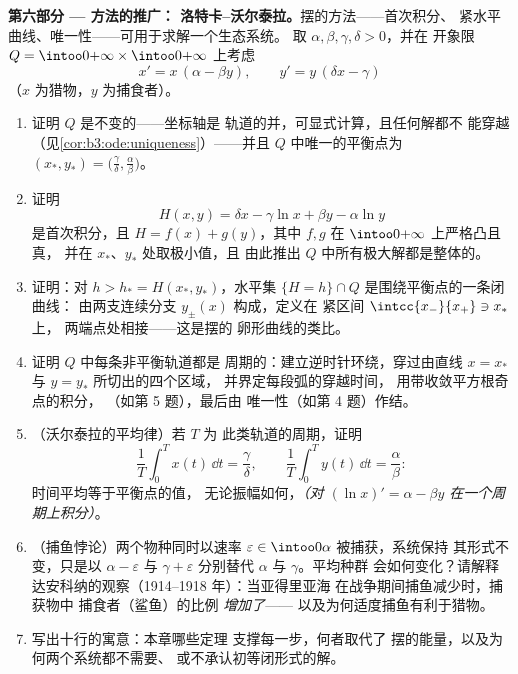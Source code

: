 \begin{problem}
\medskip
\noindent\textbf{第六部分 --- 方法的推广：
洛特卡--沃尔泰拉。}摆的方法——首次积分、
紧水平曲线、唯一性——可用于求解一个生态系统。
取 $\alpha, \beta, \gamma, \delta > 0$，并在
开象限 $Q = \intoo0{+\infty}\times\intoo0{+\infty}$ 上考虑
\[
x' = x\,(\alpha - \beta y), \qquad
y' = y\,(\delta x - \gamma)
\]
（$x$ 为猎物，$y$ 为捕食者）。
\begin{enumerate}[resume]
  \item 证明 $Q$ 是不变的——坐标轴是
        轨道的并，可显式计算，且任何解都不
        能穿越（见\cref{cor:b3:ode:uniqueness}）——并且
        $Q$ 中唯一的平衡点为 $(x_*, y_*) =
        \bigl(\frac\gamma\delta, \frac\alpha\beta\bigr)$。
  \item 证明
        \[
        H(x, y) = \delta x - \gamma\ln x + \beta y -
        \alpha\ln y
        \]
        是首次积分，且 $H = f(x) + g(y)$，其中
        $f, g$ 在 $\intoo0{+\infty}$ 上严格凸且真，
        并在 $x_*$、$y_*$ 处取极小值，且
        由此推出 $Q$ 中所有极大解都是整体的。
  \item 证明：对 $h > h_* = H(x_*, y_*)$，水平集
        $\{H = h\}\cap Q$ 是围绕平衡点的一条闭曲线：
        由两支连续分支 $y_\pm(x)$ 构成，定义在
        紧区间 $\intcc{x_-}{x_+} \ni x_*$ 上，
        两端点处相接——这是摆的
        卵形曲线的类比。
  \item 证明 $Q$ 中每条非平衡轨道都是
        周期的：建立逆时针环绕，穿过由直线
        $x = x_*$ 与 $y = y_*$ 所切出的四个区域，
        并界定每段弧的穿越时间，
        用带收敛平方根奇点的积分，
        （如第 5 题），最后由
        唯一性（如第 4 题）作结。
  \item （沃尔泰拉的平均律）若 $T$ 为
        此类轨道的周期，证明
        \[
        \frac1T\int_0^Tx(t)\,\dd t = \frac\gamma\delta,
        \qquad
        \frac1T\int_0^Ty(t)\,\dd t = \frac\alpha\beta :
        \]
        时间平均等于平衡点的值，
        无论振幅如何，\emph{（对 $(\ln x)' =
        \alpha - \beta y$ 在一个周期上积分）}。
  \item （捕鱼悖论）两个物种同时以速率
        $\varepsilon \in \intoo0\alpha$ 被捕获，系统保持
        其形式不变，只是以 $\alpha - \varepsilon$ 与 $\gamma +
        \varepsilon$ 分别替代 $\alpha$ 与 $\gamma$。平均种群
        会如何变化？请解释
        达安科纳的观察（1914--1918 年）：当亚得里亚海
        在战争期间捕鱼减少时，捕获物中
        捕食者（鲨鱼）的比例 \emph{增加了}——
        以及为何适度捕鱼有利于猎物。
  \item 写出十行的寓意：本章哪些定理
        支撑每一步，何者取代了
        摆的能量，以及为何两个系统都不需要、
        或不承认初等闭形式的解。


\end{enumerate}
\end{problem}
